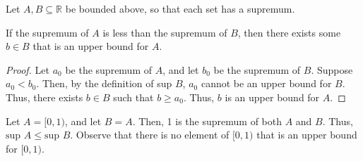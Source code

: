 \documentclass[12pt]{article}
\begin{document}
\newpage
{} Let $A, B \subseteq \mathbb R$ be bounded above, so that each set has a supremum.

\medskip
{} If the supremum of $A$ is less than the supremum of $B$, then there exists some $b \in B$ that is an upper bound for $A$.
\begin{proof}
    Let $a_0$ be the supremum of $A$, and let $b_0$ be the supremum of $B$. Suppose $a_0 < b_0$. Then, by the definition of sup $B$, $a_0$ cannot be an upper bound for $B$. Thus, there exists $b \in B$ such that $b \geq a_0$. Thus, $b$ is an upper bound for $A$.
\end{proof}

\medskip
{} Let $A=[0,1)$, and let $B = A$. Then, 1 is the supremum of both $A$ and $B$. Thus, $\text{sup } A \leq \text{sup } B$. Observe that there is no element of $[0,1)$ that is an upper bound for $[0,1)$.
\end{document}
